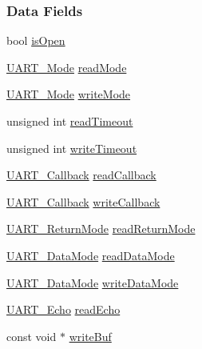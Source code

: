 \subsubsection*{Data Fields}
\begin{DoxyCompactItemize}
\item 
bool \hyperlink{struct_u_a_r_t_u_s_c_i_a___object_a95e071a9a1ef58077fa291a1ca259419}{is\-Open}
\item 
\hyperlink{_u_a_r_t_8h_a2507a620dba95cd20885c52494d19e90}{U\-A\-R\-T\-\_\-\-Mode} \hyperlink{struct_u_a_r_t_u_s_c_i_a___object_adfec51b396201813714b974e701e4ae2}{read\-Mode}
\item 
\hyperlink{_u_a_r_t_8h_a2507a620dba95cd20885c52494d19e90}{U\-A\-R\-T\-\_\-\-Mode} \hyperlink{struct_u_a_r_t_u_s_c_i_a___object_a89a3f17c6f31eb4230207ced907c6896}{write\-Mode}
\item 
unsigned int \hyperlink{struct_u_a_r_t_u_s_c_i_a___object_afa9d6ee70b6cac8e628b3c2cbec671a6}{read\-Timeout}
\item 
unsigned int \hyperlink{struct_u_a_r_t_u_s_c_i_a___object_af7c719eea095f7c01540d20e7412b5c4}{write\-Timeout}
\item 
\hyperlink{_u_a_r_t_8h_a74c489f070c575fb11654fe74302b5b8}{U\-A\-R\-T\-\_\-\-Callback} \hyperlink{struct_u_a_r_t_u_s_c_i_a___object_a587d4152d42d0ed87571ad92f9544a8f}{read\-Callback}
\item 
\hyperlink{_u_a_r_t_8h_a74c489f070c575fb11654fe74302b5b8}{U\-A\-R\-T\-\_\-\-Callback} \hyperlink{struct_u_a_r_t_u_s_c_i_a___object_a52f389cdd1f7697efc7f4e26db6bf81e}{write\-Callback}
\item 
\hyperlink{_u_a_r_t_8h_acb5a82843435a1b5d51b6c27028d914f}{U\-A\-R\-T\-\_\-\-Return\-Mode} \hyperlink{struct_u_a_r_t_u_s_c_i_a___object_a8e73b75aaf08299cc0473a5294c86cde}{read\-Return\-Mode}
\item 
\hyperlink{_u_a_r_t_8h_a694090fdb166f94ac30b809f9cba87b8}{U\-A\-R\-T\-\_\-\-Data\-Mode} \hyperlink{struct_u_a_r_t_u_s_c_i_a___object_a9f9f57b5533716570a821f6d8e306443}{read\-Data\-Mode}
\item 
\hyperlink{_u_a_r_t_8h_a694090fdb166f94ac30b809f9cba87b8}{U\-A\-R\-T\-\_\-\-Data\-Mode} \hyperlink{struct_u_a_r_t_u_s_c_i_a___object_af5d49681bcb7ff9b30235e03d0075f30}{write\-Data\-Mode}
\item 
\hyperlink{_u_a_r_t_8h_aac6a03c2e1d76f53e1d9d923dcdc24f2}{U\-A\-R\-T\-\_\-\-Echo} \hyperlink{struct_u_a_r_t_u_s_c_i_a___object_a55738ed4a75cf397788c52695349240f}{read\-Echo}
\item 
const void $\ast$ \hyperlink{struct_u_a_r_t_u_s_c_i_a___object_a3f9618be43ad4439553aac79181ca845}{write\-Buf}

\end{DoxyCompactItemize}
